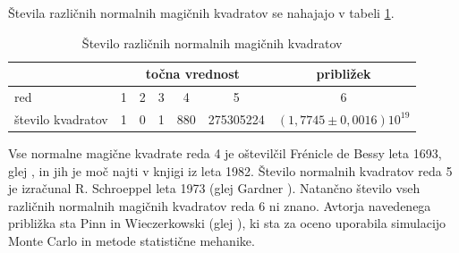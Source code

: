 \documentclass[a4paper,12pt]{article}
\begin{document}
Števila različnih normalnih magičnih kvadratov se nahajajo v tabeli \ref{table:stevila}.
\begin{table}[ht!]
   \centering
   \caption{Število različnih normalnih magičnih kvadratov}
   \label{table:stevila}
   \begin{tabular}{l c c c c c c}\hline
   
   
   
      & \multicolumn{5}{c}{točna vrednost}& približek \\
      \midrule
      red &   1 & 2 & 3 & 4 & 5 & 6\\
      število kvadratov & 1 & 0 & 1 &880 & 275305224 & \((1{,}7745\pm0{,}0016)10^{19}\)\\
      \bottomrule
   \end{tabular}
\end{table}
Vse normalne magične kvadrate reda 4 je oštevilčil Frénicle de Bessy
   leta 1693, glej \cite{bessy}, in jih je moč najti v knjigi \cite{berlekamp}
   iz leta 1982. Število normalnih kvadratov reda 5 je izračunal
   R. Schroeppel leta 1973 (glej Gardner \cite{gardner}).
   Natančno število vseh različnih normalnih magičnih kvadratov reda 6 ni znano.
   Avtorja navedenega približka sta Pinn in Wieczerkowski (glej \cite{pinn}), ki
   sta za oceno uporabila simulacijo Monte Carlo in metode statistične mehanike.
   
   

\newpage




\end{document}
